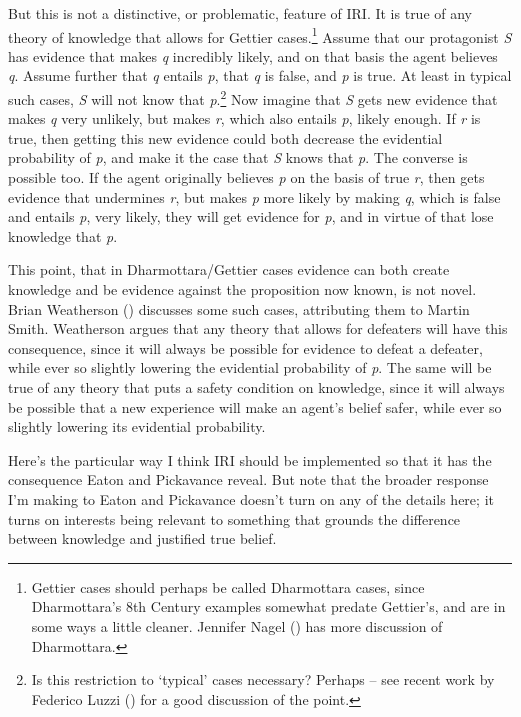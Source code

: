 \documentclass[
  11pt,
  letterpaper,
  DIV=11,
  numbers=noendperiod,
  twoside]{scrartcl}
\begin{document}
But this is not a distinctive, or problematic, feature of IRI. It is
true of any theory of knowledge that allows for Gettier
cases.\footnote{Gettier cases should perhaps be called Dharmottara
  cases, since Dharmottara's 8th Century examples somewhat predate
  Gettier's, and are in some ways a little cleaner. Jennifer Nagel
  () has more discussion of
  Dharmottara.} Assume that our protagonist \emph{S} has evidence that
makes \emph{q} incredibly likely, and on that basis the agent believes
\emph{q}. Assume further that \emph{q} entails \emph{p}, that \emph{q}
is false, and \emph{p} is true. At least in typical such cases, \emph{S}
will not know that \emph{p}.\footnote{Is this restriction to `typical'
  cases necessary? Perhaps -- see recent work by Federico Luzzi
  () for a good discussion of the point.}
Now imagine that \emph{S} gets new evidence that makes \emph{q} very
unlikely, but makes \emph{r}, which also entails \emph{p}, likely
enough. If \emph{r} is true, then getting this new evidence could both
decrease the evidential probability of \emph{p}, and make it the case
that \emph{S} knows that \emph{p}. The converse is possible too. If the
agent originally believes \emph{p} on the basis of true \emph{r}, then
gets evidence that undermines \emph{r}, but makes \emph{p} more likely
by making \emph{q}, which is false and entails \emph{p}, very likely,
they will get evidence for \emph{p}, and in virtue of that lose
knowledge that \emph{p}.

This point, that in Dharmottara/Gettier cases evidence can both create
knowledge and be evidence against the proposition now known, is not
novel. Brian Weatherson ()
discusses some such cases, attributing them to Martin Smith. Weatherson
argues that any theory that allows for defeaters will have this
consequence, since it will always be possible for evidence to defeat a
defeater, while ever so slightly lowering the evidential probability of
\emph{p}. The same will be true of any theory that puts a safety
condition on knowledge, since it will always be possible that a new
experience will make an agent's belief safer, while ever so slightly
lowering its evidential probability.

Here's the particular way I think IRI should be implemented so that it
has the consequence Eaton and Pickavance reveal. But note that the
broader response I'm making to Eaton and Pickavance doesn't turn on any
of the details here; it turns on interests being relevant to something
that grounds the difference between knowledge and justified true belief.
\end{document}
